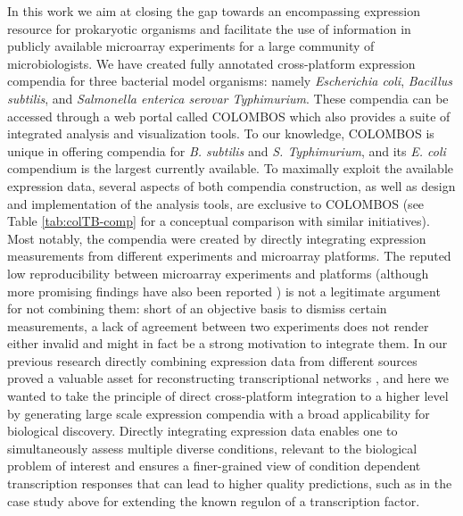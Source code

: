 In this work we aim at closing the gap towards an encompassing expression 
resource for prokaryotic organisms and facilitate the use of information in 
publicly available microarray experiments for a large community of 
microbiologists. We have created fully annotated cross-platform expression 
compendia for three bacterial model organisms: namely {\it Escherichia coli}, 
{\it Bacillus subtilis}, and {\it Salmonella enterica serovar Typhimurium}. 
These compendia can be accessed through a web portal called COLOMBOS which also 
provides a suite of integrated analysis and visualization tools. To our 
knowledge, COLOMBOS is unique in offering compendia for {\it B. subtilis} and 
{\it S. Typhimurium}, and its {\it E. coli} compendium is the largest currently 
available. To maximally exploit the available expression data, several aspects 
of both compendia construction, as well as design and implementation of the 
analysis tools, are exclusive to COLOMBOS (see Table \ref{tab:colTB-comp} for a 
conceptual comparison with similar initiatives). Most notably, the compendia 
were created by directly integrating expression measurements from different 
experiments and microarray platforms. The reputed low reproducibility between 
microarray experiments and platforms \cite{Bammler2005, Tan2003} (although more 
promising findings have also been reported \cite{Shi2006, Kuo2006, Shi2005}) is 
not a legitimate argument for not combining them: short of an objective basis 
to dismiss certain measurements, a lack of agreement between two experiments 
does not render either invalid and might in fact be a strong motivation to 
integrate them. In our previous research directly combining expression data 
from different sources proved a valuable asset for reconstructing 
transcriptional networks \cite{Lemmens2009, Fadda2009, Zarrineh2011}, and here 
we wanted to take the principle of direct cross-platform integration to a 
higher level by generating large scale expression compendia with a broad 
applicability for biological discovery. Directly integrating expression data 
enables one to simultaneously assess multiple diverse conditions, relevant to 
the biological problem of interest and ensures a finer-grained view of 
condition dependent transcription responses that can lead to higher quality 
predictions, such as in the case study above for extending the known regulon of 
a transcription factor.

